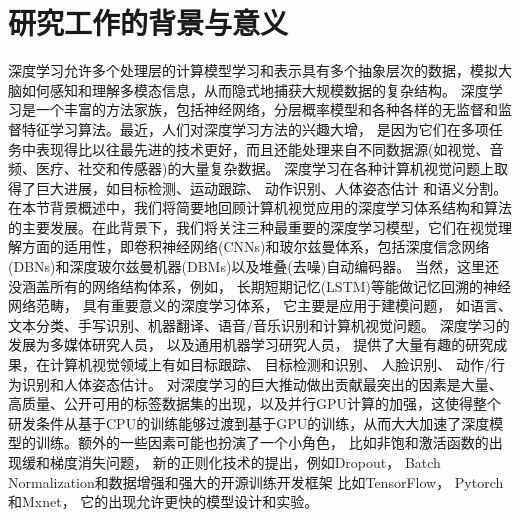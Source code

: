\documentclass[promaster]{thesis-uestc}
\begin{document}
\section{研究工作的背景与意义}
深度学习允许多个处理层的计算模型学习和表示具有多个抽象层次的数据，模拟大脑如何感知和理解多模态信息，从而隐式地捕获大规模数据的复杂结构。
深度学习是一个丰富的方法家族，包括神经网络，分层概率模型和各种各样的无监督和监督特征学习算法。最近，人们对深度学习方法的兴趣大增，
是因为它们在多项任务中表现得比以往最先进的技术更好，而且还能处理来自不同数据源(如视觉、音频、医疗、社交和传感器)的大量复杂数据。
深度学习在各种计算机视觉问题上取得了巨大进展，如目标检测\cite{detection_rcnn}\cite{detect_libra_rcnn}、运动跟踪\cite{siamrpn++}\cite{siamfc++}、
动作识别\cite{action_reg1}\cite{action_reg2}、人体姿态估计\cite{pose1}\cite{pose2}
和语义分割\cite{seg1}\cite{seg2}。
在本节背景概述中，我们将简要地回顾计算机视觉应用的深度学习体系结构和算法的主要发展。在此背景下，我们将关注三种最重要的深度学习模型，它们在视觉理解方面的适用性，即卷积神经网络(CNNs)和玻尔兹曼体系，包括深度信念网络(DBNs)和深度玻尔兹曼机器(DBMs)以及堆叠(去噪)自动编码器。
当然，这里还没涵盖所有的网络结构体系，例如， 长期短期记忆(LSTM)等能做记忆回溯的神经网络范畴， 具有重要意义的深度学习体系， 它主要是应用于建模问题， 如语言、文本分类、手写识别、机器翻译、语音/音乐识别和计算机视觉问题。
深度学习的发展为多媒体研究人员， 以及通用机器学习研究人员， 提供了大量有趣的研究成果，在计算机视觉领域上有如目标跟踪、 目标检测和识别、 人脸识别、 动作/行为识别和人体姿态估计。
对深度学习的巨大推动做出贡献最突出的因素是大量、高质量、公开可用的标签数据集的出现，以及并行GPU计算的加强，这使得整个研发条件从基于CPU的训练能够过渡到基于GPU的训练，从而大大加速了深度模型的训练。额外的一些因素可能也扮演了一个小角色，
比如非饱和激活函数的出现缓和梯度消失问题， 新的正则化技术的提出，例如Dropout\cite{dropout}， Batch Normalization\cite{batchnorm}和数据增强和强大的开源训练开发框架
比如TensorFlow\cite{tf}， Pytorch\cite{pytorch}和Mxnet\cite{mxnet}， 它的出现允许更快的模型设计和实验。
\end{document}
